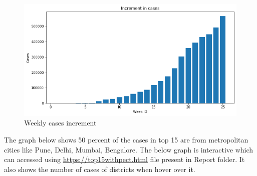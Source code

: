 \documentclass[12pt]{article}
\begin{document}
\begin{figure}[h!]
\centering
\includegraphics[scale=.4]{weekly-cases}
\caption{Weekly cases increment}
\end{figure}
\newpage
The graph below shows 50 percent of the cases in top 15 are from metropolitan cities like Pune, Delhi, Mumbai, Bengalore.  The below graph is interactive which can accessed using \href{https://top15withpect.html}{https://top15withpect.html} file present in Report folder. It also shows the number of cases of districts when hover over it.
\end{document}

